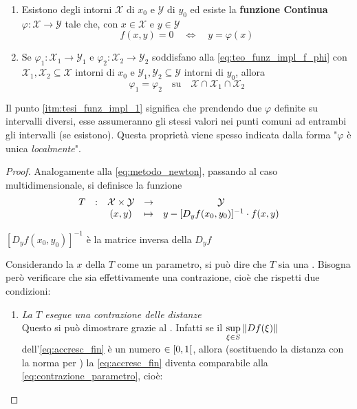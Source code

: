 \begin{theorem}
\begin{enumerate}
		\item Esistono degli intorni $\mathcal{X}$ di $x_0$ e $\mathcal{Y}$ di $y_0$ ed esiste la \textbf{funzione Continua} $\varphi: \mathcal{X} \to \mathcal{Y}$ tale che, con $x \in \mathcal{X}$ e $y \in \mathcal{Y}$
			\begin{equation}
				\label{eq:teo_funz_impl_f_phi}
				f(x,y) = 0 \quad \iff \quad y = \varphi(x)
			\end{equation}
		\item \label{itm:tesi_funz_impl_1} Se $\varphi_1: \mathcal{X}_1 \to \mathcal{Y}_1$ e $\varphi_2: \mathcal{X}_2 \to \mathcal{Y}_2$ soddisfano alla \cref{eq:teo_funz_impl_f_phi} con $\mathcal{X}_1, \mathcal{X}_2 \subseteq \mathcal{X}$ intorni di $x_0$ e $\mathcal{Y}_1, \mathcal{Y}_2 \subseteq \mathcal{Y}$ intorni di $y_0$, allora
			\[\varphi_1 = \varphi_2 \quad \text{su} \quad \mathcal{X} \cap \mathcal{X}_1 \cap \mathcal{X}_2\]
	\end{enumerate}
	\begin{note}
		Il punto \ref{itm:tesi_funz_impl_1} significa che prendendo due $\varphi$ definite su intervalli diversi, esse assumeranno gli stessi valori nei punti comuni ad entrambi gli intervalli (se esistono). Questa proprietà viene spesso indicata dalla forma "$\varphi$ è unica \textit{localmente}".
	\end{note}
	\begin{proof}
		Analogamente alla \cref{eq:metodo_newton}, passando al caso multidimensionale, si definisce la funzione
		\begin{equation}
			\label{eq:funz_impl_T}
			\begin{array}{ccccc} {T} & : & {\mathcal{X} \times \mathcal{Y}} & \to & {\mathcal{Y}} \\ & & {(x,y)} & \mapsto & {y - [D_yf(x_0, y_0)]^{-1} \cdot f(x, y)} \\ \end{array}
		\end{equation}
		\begin{note}
			$[D_yf(x_0, y_0)]^{-1}$ è la matrice inversa della $D_yf$
		\end{note}
		Considerando la $x$ della $T$ come un parametro, si può dire che $T$ sia una . Bisogna però verificare che sia effettivamente una contrazione, cioè che rispetti due condizioni:
		\begin{enumerate}
			\item \textit{La $T$ esegue una contrazione delle distanze}\\
				Questo si può dimostrare grazie al . Infatti se il $\sup\limits_{\xi \in S} \left\|Df(\xi)\right\|$ dell'\cref{eq:accresc_fin} è un numero $\in \left[0,1\right[$, allora (sostituendo la distanza con la norma per ) la \cref{eq:accresc_fin} diventa comparabile alla \cref{eq:contrazione_parametro}, cioè:

\end{enumerate}
\end{proof}
\end{theorem}
